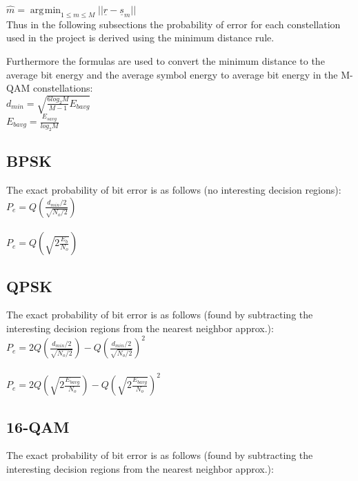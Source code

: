 \documentclass[]{article}
\DeclareMathOperator*{\argmin}{\arg\!\min}
\begin{document}
$\hat{m} = \argmin_{1\leq m \leq M}{||\underline{r} - \underline{s}_m||}$ 
\\

Thus in the following subsections the probability of error for each constellation used in the project is derived using the minimum distance rule.

Furthermore the formulas are used to convert the minimum distance to the average bit energy and the average symbol energy to average bit energy in the M-QAM constellations:\\

$d_{min} = \sqrt{\frac{6log_2M}{M-1}E_{bavg}} $\\

$E_{bavg} = \frac{E_{savg}}{log_2M}$



\subsection{BPSK}
\label{sec:bpsk}
The exact probability of bit error is as follows (no interesting decision regions):\\

$ P_e = Q(\frac{d_{min}/2}{\sqrt{N_o/2}}) $ \\
\\
$ P_e = Q(\sqrt{2\frac{E_b}{N_o}}) $ \\

\subsection{QPSK}
\label{sec:qpsk}

The exact probability of bit error is as follows (found by subtracting the interesting decision regions from the nearest neighbor approx.):\\

$ P_e = 2Q(\frac{d_{min}/2}{\sqrt{N_o/2}})-Q(\frac{d_{min}/2}{\sqrt{N_o/2}})^2$ \\
\\
$ P_e = 2Q(\sqrt{2\frac{E_{bavg}}{N_o}})-Q(\sqrt{2\frac{E_{bavg}}{N_o}})^2$ \\

\subsection{16-QAM}
\label{sec:qam16}

The exact probability of bit error is as follows (found by subtracting the interesting decision regions from the nearest neighbor approx.):\\
\end{document}
